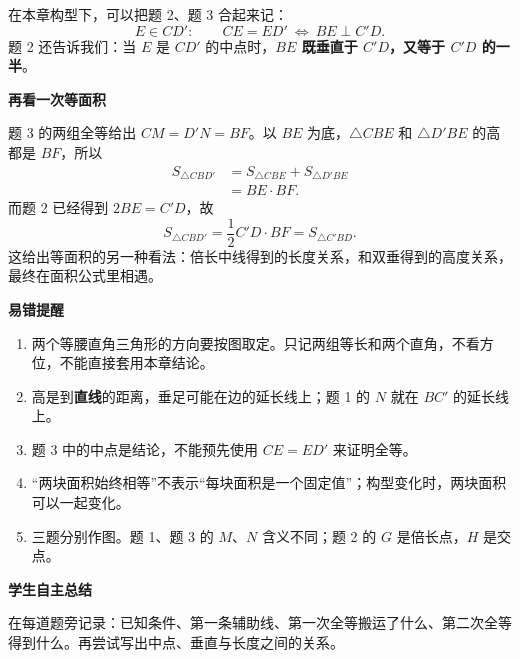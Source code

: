 \documentclass[11pt]{article}
\newcommand{\headingfont}{\sffamily}\typeout{loom-cn: heading = sffamily}%
\theoremstyle{loomplain}
\theoremstyle{loomdefn}
\theoremstyle{loomexm}
\theoremstyle{loomrem}
\newcommand{\block}[1]{\par\medskip\noindent
  {\headingfont\bfseries\color{indigo}#1}\par\smallskip}
\begin{document}
在本章构型下，可以把题 2、题 3 合起来记：
\[
E\in CD':\qquad CE=ED'\ \Longleftrightarrow\ BE\perp C'D.
\]
题 2 还告诉我们：当 \(E\) 是 \(CD'\) 的中点时，\textbf{\(BE\) 既垂直于 \(C'D\)，又等于 \(C'D\) 的一半}。

\block{再看一次等面积}
题 3 的两组全等给出 \(CM=D'N=BF\)。以 \(BE\) 为底，\(\triangle CBE\) 和 \(\triangle D'BE\) 的高都是 \(BF\)，所以
\begin{align*}
S_{\triangle CBD'}
&=S_{\triangle CBE}+S_{\triangle D'BE}\\
&=BE\cdot BF.
\end{align*}
而题 2 已经得到 \(2BE=C'D\)，故
\[
S_{\triangle CBD'}=\frac12 C'D\cdot BF=S_{\triangle C'BD}.
\]
这给出等面积的另一种看法：倍长中线得到的长度关系，和双垂得到的高度关系，最终在面积公式里相遇。

\block{易错提醒}
\begin{enumerate}
\item 两个等腰直角三角形的方向要按图取定。只记两组等长和两个直角，不看方位，不能直接套用本章结论。
\item 高是到\textbf{直线}的距离，垂足可能在边的延长线上；题 1 的 \(N\) 就在 \(BC'\) 的延长线上。
\item 题 3 中的中点是结论，不能预先使用 \(CE=ED'\) 来证明全等。
\item “两块面积始终相等”不表示“每块面积是一个固定值”；构型变化时，两块面积可以一起变化。
\item 三题分别作图。题 1、题 3 的 \(M\)、\(N\) 含义不同；题 2 的 \(G\) 是倍长点，\(H\) 是交点。
\end{enumerate}
\else
\block{学生自主总结}
在每道题旁记录：已知条件、第一条辅助线、第一次全等搬运了什么、第二次全等得到什么。再尝试写出中点、垂直与长度之间的关系。
\vspace{8\baselineskip}
\fi
\end{document}
